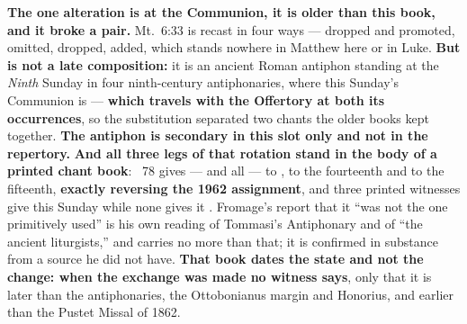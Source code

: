 \textbf{The one alteration is at the Communion, it is older than this book, and
it broke a pair.} Mt.\ 6:33 is recast in four ways ---  dropped and
 promoted,  omitted,  dropped,
 added, which stands nowhere in Matthew here or in Luke.
\textbf{But  is not a late composition:} it is an ancient
Roman antiphon standing at the \emph{Ninth} Sunday in four ninth-century
antiphonaries, where this Sunday's Communion is 
--- \textbf{which travels with the Offertory  at both
its occurrences}, so the substitution separated two chants the older books kept
together. \textbf{The antiphon is secondary in this slot only and not in the
repertory.} \textbf{And all three legs of that rotation stand in the body of a
printed chant book}: ~78 gives 
---  and all --- to ,  to the fourteenth and  to the
fifteenth, \textbf{exactly reversing the 1962 assignment}, and three printed
witnesses give this Sunday  while none gives it
. Fromage's report that it ``was not the one primitively used''
is his own reading of Tommasi's Antiphonary and of ``the ancient liturgists,''
and carries no more than that; it is confirmed in substance from a source he did
not have. \textbf{That book dates the state and not the change: when the exchange was made
no witness says}, only that it is later than the antiphonaries, the Ottobonianus
margin and Honorius, and earlier than the Pustet Missal of 1862.

\clearpage
